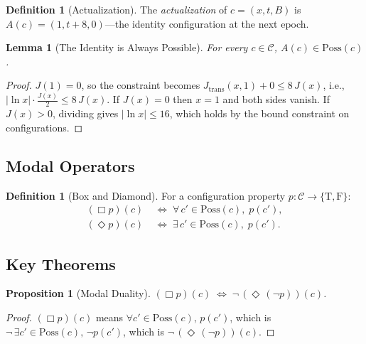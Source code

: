 \documentclass[12pt,a4paper]{article}
\newtheorem{lemma}[theorem]{Lemma}
\newtheorem{proposition}[theorem]{Proposition}
\theoremstyle{definition}
\newtheorem{definition}[theorem]{Definition}
\theoremstyle{remark}
\begin{document}
\begin{definition}[Actualization]
\label{def:actualize}
The \emph{actualization} of $c = (x, t, B)$ is
$A(c) = (1, t{+}8, 0)$---the identity configuration at the next epoch.
\end{definition}

\begin{lemma}[The Identity is Always Possible]
\label{lem:identity-possible}
For every $c \in \mathcal{C}$, $A(c) \in \mathrm{Poss}(c)$.
\end{lemma}

\begin{proof}
$J(1) = 0$, so the constraint becomes
$J_{\mathrm{trans}}(x, 1) + 0 \leq 8\,J(x)$, i.e.,
$|\!\ln x| \cdot \tfrac{J(x)}{2} \leq 8\,J(x)$.  If $J(x) = 0$ then
$x = 1$ and both sides vanish.  If $J(x) > 0$, dividing gives
$|\!\ln x| \leq 16$, which holds by the bound constraint on
configurations.
\end{proof}

\subsection{Modal Operators}

\begin{definition}[Box and Diamond]
\label{def:box-diamond}
For a configuration property
$p : \mathcal{C} \to \{\mathrm{T}, \mathrm{F}\}$:
\begin{align}
  (\Box p)(c) &\;\Longleftrightarrow\;
  \forall\, c' \in \mathrm{Poss}(c),\; p(c'), \\
  (\Diamond p)(c) &\;\Longleftrightarrow\;
  \exists\, c' \in \mathrm{Poss}(c),\; p(c').
\end{align}
\end{definition}

\subsection{Key Theorems}

\begin{proposition}[Modal Duality]
\label{prop:duality}
$(\Box p)(c) \;\Longleftrightarrow\; \neg\,(\Diamond\,(\neg p))(c)$.
\end{proposition}

\begin{proof}
$(\Box p)(c)$ means $\forall c' \in \mathrm{Poss}(c),\, p(c')$, which
is $\neg\,\exists c' \in \mathrm{Poss}(c),\, \neg p(c')$, which is
$\neg\,(\Diamond\,(\neg p))(c)$.
\end{proof}
\end{document}
